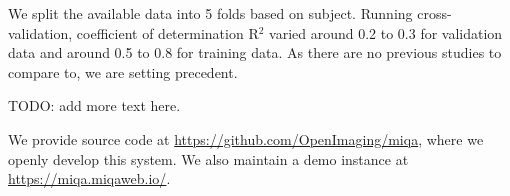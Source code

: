\documentclass{midl} %
\begin{document}
We split the available data into 5 folds based on subject. Running cross-validation, coefficient of determination R$^2$ varied around 0.2 to 0.3 for validation data and around 0.5 to 0.8 for training data. As there are no previous studies to compare to, we are setting precedent.

TODO: add more text here.

We provide source code at \url{https://github.com/OpenImaging/miqa}, where we openly develop this system. We also maintain a demo instance at \url{https://miqa.miqaweb.io/}.






\end{document}
